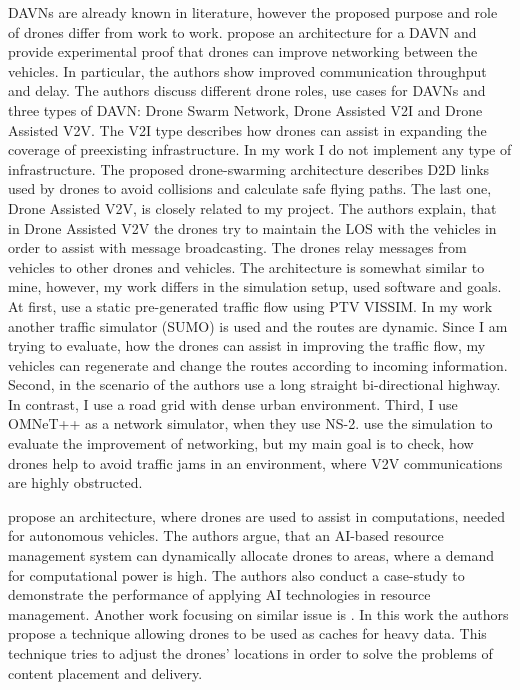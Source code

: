 \documentclass[]{nsm-thesis}
\begin{document}
\acp{DAVN} are already known in literature, however the proposed purpose and role of drones differ from work to work. \textcite{shi2018drone} propose an architecture for a \ac{DAVN} and provide experimental proof that drones can improve networking between the vehicles. In particular, the authors show improved communication throughput and delay. The authors discuss different drone roles, use cases for \acp{DAVN} and three types of \ac{DAVN}: Drone Swarm Network, Drone Assisted \ac{V2I} and Drone Assisted \ac{V2V}. The \ac{V2I} type describes how drones can assist in expanding the coverage of preexisting infrastructure. In my work I do not implement any type of infrastructure. The proposed drone-swarming architecture describes \ac{D2D} links used by drones to avoid collisions and calculate safe flying paths. The last one, Drone Assisted \ac{V2V}, is closely related to my project. The authors explain, that in Drone Assisted \ac{V2V} the drones try to maintain the \ac{LOS} with the vehicles in order to assist with message broadcasting. The drones relay messages from vehicles to other drones and vehicles. The architecture is somewhat similar to mine, however, my work differs in the simulation setup, used software and goals. At first, \textcite{shi2018drone} use a static pre-generated traffic flow using PTV VISSIM. In my work another traffic simulator (SUMO) is used and the routes are dynamic. Since I am trying to evaluate, how the drones can assist in improving the traffic flow, my vehicles can regenerate and change the routes according to incoming information. Second, in the scenario of \textcite{shi2018drone} the authors use a long straight bi-directional highway. In contrast, I use a road grid with dense urban environment. Third, I use OMNeT++ as a network simulator, when they use NS-2. \textcite{shi2018drone} use the simulation to evaluate the improvement of networking, but my main goal is to check, how drones help to avoid traffic jams in an environment, where \ac{V2V} communications are highly obstructed.

\textcite{peng2021edge} propose an architecture, where drones are used to assist in computations, needed for autonomous vehicles. The authors argue, that an AI-based resource management system can dynamically allocate drones to areas, where a demand for computational power is high. The authors also conduct a case-study to demonstrate the performance of applying AI technologies in resource management. Another work focusing on similar issue is \textcite{Wu2020Caching}. In this work the authors propose a technique allowing drones to be used as caches for heavy data. This technique tries to adjust the drones' locations in order to solve the problems of content placement and delivery.
\end{document}
